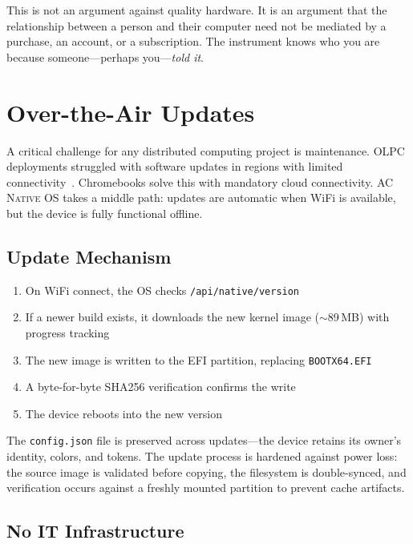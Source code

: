 \documentclass[10pt,letterpaper,twocolumn]{article}
\newcommand{\acos}{\textsc{AC Native OS}}
\begin{document}
This is not an argument against quality hardware. It is an argument that the relationship between a person and their computer need not be mediated by a purchase, an account, or a subscription. The instrument knows who you are because someone---perhaps you---\emph{told it}.


\section{Over-the-Air Updates}
\label{sec:ota}

A critical challenge for any distributed computing project is maintenance. OLPC deployments struggled with software updates in regions with limited connectivity~\citep{warschauer2004technology}. Chromebooks solve this with mandatory cloud connectivity. \acos{} takes a middle path: updates are automatic when WiFi is available, but the device is fully functional offline.

\subsection{Update Mechanism}

\begin{enumerate}
  \item On WiFi connect, the OS checks \texttt{/api/native/version}
  \item If a newer build exists, it downloads the new kernel image ($\sim$89\,MB) with progress tracking
  \item The new image is written to the EFI partition, replacing \texttt{BOOTX64.EFI}
  \item A byte-for-byte SHA256 verification confirms the write
  \item The device reboots into the new version
\end{enumerate}

The \texttt{config.json} file is preserved across updates---the device retains its owner's identity, colors, and tokens. The update process is hardened against power loss: the source image is validated before copying, the filesystem is double-synced, and verification occurs against a freshly mounted partition to prevent cache artifacts.

\subsection{No IT Infrastructure}
\end{document}
